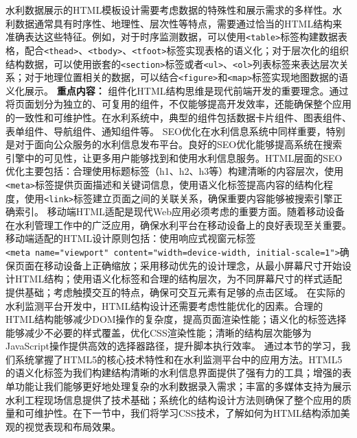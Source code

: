 水利数据展示的HTML模板设计需要考虑数据的特殊性和展示需求的多样性。水利数据通常具有时序性、地理性、层次性等特点，需要通过恰当的HTML结构来准确表达这些特征。例如，对于时序监测数据，可以使用\texttt{\textless{}table\textgreater{}}标签构建数据表格，配合\texttt{\textless{}thead\textgreater{}}、\texttt{\textless{}tbody\textgreater{}}、\texttt{\textless{}tfoot\textgreater{}}标签实现表格的语义化；对于层次化的组织结构数据，可以使用嵌套的\texttt{\textless{}section\textgreater{}}标签或者\texttt{\textless{}ul\textgreater{}}、\texttt{\textless{}ol\textgreater{}}列表标签来表达层次关系；对于地理位置相关的数据，可以结合\texttt{\textless{}figure\textgreater{}}和\texttt{\textless{}map\textgreater{}}标签实现地图数据的语义化展示。 \textbf{重点内容：} 组件化HTML结构思维是现代前端开发的重要理念。通过将页面划分为独立的、可复用的组件，不仅能够提高开发效率，还能确保整个应用的一致性和可维护性。在水利系统中，典型的组件包括数据卡片组件、图表组件、表单组件、导航组件、通知组件等。 SEO优化在水利信息系统中同样重要，特别是对于面向公众服务的水利信息发布平台。良好的SEO优化能够提高系统在搜索引擎中的可见性，让更多用户能够找到和使用水利信息服务。HTML层面的SEO优化主要包括：合理使用标题标签（h1、h2、h3等）构建清晰的内容层次，使用\texttt{\textless{}meta\textgreater{}}标签提供页面描述和关键词信息，使用语义化标签提高内容的结构化程度，使用\texttt{\textless{}link\textgreater{}}标签建立页面之间的关联关系，确保重要内容能够被搜索引擎正确索引。 移动端HTML适配是现代Web应用必须考虑的重要方面。随着移动设备在水利管理工作中的广泛应用，确保水利平台在移动设备上的良好表现至关重要。移动端适配的HTML设计原则包括：使用响应式视窗元标签\texttt{\textless{}meta\ name="viewport"\ content="width=device-width,\ initial-scale=1"\textgreater{}}确保页面在移动设备上正确缩放；采用移动优先的设计理念，从最小屏幕尺寸开始设计HTML结构；使用语义化标签和合理的结构层次，为不同屏幕尺寸的样式适配提供基础；考虑触摸交互的特点，确保可交互元素有足够的点击区域。 在实际的水利监测平台开发中，HTML结构设计还需要考虑性能优化的因素。合理的HTML结构能够减少DOM操作的复杂度，提高页面渲染性能；语义化的标签选择能够减少不必要的样式覆盖，优化CSS渲染性能；清晰的结构层次能够为JavaScript操作提供高效的选择器路径，提升脚本执行效率。 通过本节的学习，我们系统掌握了HTML5的核心技术特性和在水利监测平台中的应用方法。HTML5的语义化标签为我们构建结构清晰的水利信息界面提供了强有力的工具；增强的表单功能让我们能够更好地处理复杂的水利数据录入需求；丰富的多媒体支持为展示水利工程现场信息提供了技术基础；系统化的结构设计方法则确保了整个应用的质量和可维护性。在下一节中，我们将学习CSS技术，了解如何为HTML结构添加美观的视觉表现和布局效果。

